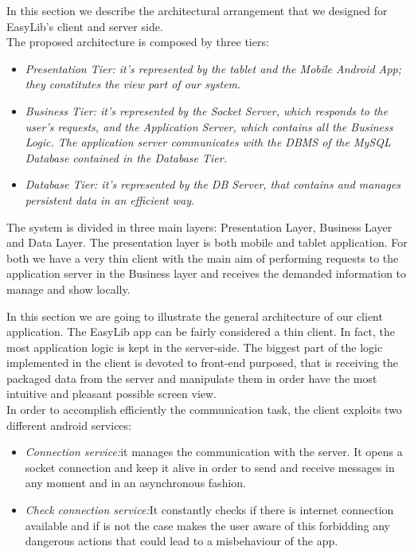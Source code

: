 \vspace*{-5mm}

In this section we describe the architectural arrangement that we designed for EasyLib’s client and server side.\\

The proposed architecture is composed by three tiers:

\begin{itemize}
\item \emph{Presentation Tier: it’s represented by the tablet and the Mobile Android App;  they constitutes the view part of our system.}
\item \emph{Business Tier: it’s represented by the Socket Server, which responds to the user’s requests, and the Application Server, which contains all the Business Logic. The application server communicates with the DBMS of the MySQL Database contained in the Database Tier.}
\item \emph{Database Tier: it’s represented by the DB Server, that contains and manages persistent data in an efficient way. }
\end{itemize}

The system is divided in three main layers: Presentation Layer, Business Layer and Data Layer. The presentation layer is both mobile and tablet application. For both we have a very thin client with the main aim of performing requests to the application server in the Business layer and receives the demanded information to manage and show locally.

In this section we are going to illustrate the general architecture of our client application. The EasyLib app can be fairly considered a thin client. In fact, the most application logic is kept in the server-side. The biggest part of the logic implemented in the client is devoted to front-end purposed, that is receiving the packaged data from the server and manipulate them in order have the most intuitive and pleasant possible screen view.\\ 
In order to accomplish efficiently the communication task, the client exploits two different android services: 

\begin{itemize}
\item \emph{Connection service:}it manages the communication with the server. It opens a socket connection and keep it alive in order to send and receive messages in any moment and in an asynchronous fashion.
\item \emph{Check connection service:}It constantly checks if there is internet connection available and if is not the case makes the user aware of this forbidding any dangerous actions that could lead to a misbehaviour of the app.
\end{itemize}

